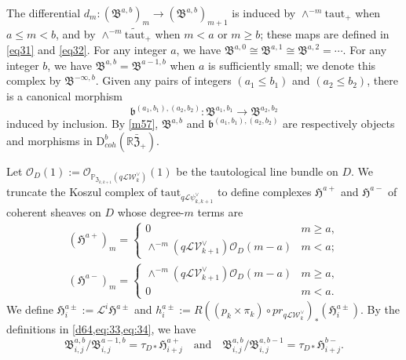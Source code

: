 \documentclass{amsart}
\numberwithin{equation}{section}
\newcommand\mc{\mathcal}
\newcommand\mf{\mathfrak}
\newcommand\mb{\mathbb}
\newcommand{\taut}{\mathrm{taut}}
\newcommand{\D}{\mathrm{D}}
\theoremstyle{definition}
\theoremstyle{remark}
\begin{document}
  The differential $d_{m}:(\mf{B}^{a,b})_{m}\to (\mf{B}^{a,b})_{m+1}$ is induced by $\wedge^{-m}\taut_+$ when $a\leq m<b$, and by $\wedge^{-m}\widetilde{\taut}_+$ when $m<a$ or $m\geq b$; these maps are defined in \cref{eq31} and \cref{eq32}. For any integer $a$, we have $\mf{B}^{a,0}\cong \mf{B}^{a,1}\cong \mf{B}^{a,2}=\cdots$. For any integer $b$, we have $\mf{B}^{a,b}=\mf{B}^{a-1,b}$ when $a$ is sufficiently small; we denote this complex by $\mf{B}^{-\infty,b}$. Given any pairs of integers $(a_{1}\leq b_{1})$ and $(a_{2}\leq b_{2})$, there is a canonical morphism
  $$\mf{b}^{(a_{1},b_{1}),(a_{2},b_{2})}:\mf{B}^{a_{1},b_{1}}\to \mf{B}^{a_{2},b_{2}}$$ 
  induced by inclusion. By \cref{m57}, $\mf{B}^{a,b}$ and $\mf{b}^{(a_{1},b_{1}),(a_{2},b_{2})}$ are respectively objects and morphisms in $\D^{b}_{coh}(\mb{R}\bar{\mf{Z}}_{+})$.


Let $\mc{O}_{D}(1):=\mc{O}_{\mb{P}_{\mf{Z}_{k,k+1}}(q\mc{L}\mc{W}_{k}^{\vee})}(1)$ be the tautological line bundle on $D$. We truncate the Koszul complex of $\taut_{q\mc{L}\psi_{k,k+1}^{\vee}}$ to define complexes $\mf{H}^{a+}$ and $\mf{H}^{a-}$ of coherent sheaves on $D$ whose degree-$m$ terms are
  \begin{align}
    \label{eq:33}
     (\mf{H}^{a+})_{m}=
    \begin{cases}
      0 & m\geq a, \\
      \wedge^{-m}(q\mc{L}\mc{V}_{k+1}^{\vee})\mc{O}_{D}(m-a) & m<a;
    \end{cases}\\
      \label{eq:34}
    (\mf{H}^{a-})_{m}=
    \begin{cases}
      \wedge^{-m}(q\mc{L}\mc{V}_{k+1}^{\vee})\mc{O}_{D}(m-a) & m\geq a, \\
      0 & m< a.
    \end{cases}
  \end{align}
We define $\mf{H}_{i}^{a\pm}:=\mc{L}^{i}\mf{H}^{a\pm}$ and $h_{i}^{a\pm}:=R((p_{k}\times \pi_{k})\circ pr_{q\mc{L}\mc{W}_{k}^{\vee}})_{*}(\mf{H}_{i}^{a\pm})$. By the definitions in \cref{d64,eq:33,eq:34}, we have
\begin{equation}
  \label{eq:exact3}
\mf{B}_{i,j}^{a,b}/\mf{B}_{i,j}^{a-1,b}=\tau_{D*}\mf{H}_{i+j}^{a+} \quad \text{and} \quad \mf{B}_{i,j}^{a,b}/\mf{B}_{i,j}^{a,b-1}=\tau_{D*}\mf{H}_{i+j}^{b-}.
\end{equation}
\end{document}
